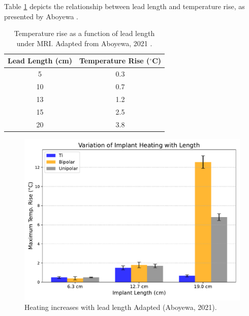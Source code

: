 Table \ref{tab:lead_temp_rise} depicts the relationship between lead length and temperature rise, as presented by Aboyewa \cite{aboyewa2021}.

\begin{table}[H]
    \centering
    \renewcommand{\arraystretch}{1.2}
    \setlength{\tabcolsep}{10pt}
    \begin{tabular}{|c|c|}
        \hline
        \textbf{Lead Length (cm)} & \textbf{Temperature Rise ($^{\circ}$C)} \\
        \hline
        5  & 0.3 \\
        10 & 0.7 \\
        13 & 1.2 \\
        15 & 2.5 \\
        20 & 3.8 \\
        \hline
    \end{tabular}
    \caption{Temperature rise as a function of lead length under MRI. Adapted from Aboyewa, 2021 \cite{aboyewa2021}.}
    \label{tab:lead_temp_rise}
\end{table}





\begin{figure}[H]
    \centering
    \includegraphics[width=0.8\linewidth]{Figure_4_8_Implant_Heating_Length_With_Errors.pdf}
    \caption{Heating increases with lead length Adapted (Aboyewa, 2021).}
    \label{fig:implant_heating_length}
\end{figure}



